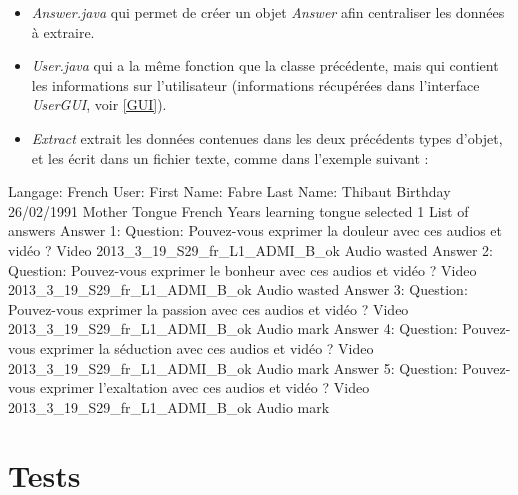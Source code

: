  \begin{itemize}
  \item \textit{Answer.java} qui permet de créer un objet \textit{Answer} afin centraliser les données à extraire.
  \item \textit{User.java} qui a la même fonction que la classe précédente, mais qui contient les informations sur l'utilisateur (informations récupérées dans l'interface \textit{UserGUI}, voir \ref{GUI}).
  \item \textit{Extract} extrait les données contenues dans les deux précédents types d'objet, et les écrit dans un fichier texte, comme dans l'exemple suivant :
 \end{itemize}
 
 \begin{verbatimtab}
  Langage:   French
  User:
      First Name:   Fabre
      Last Name:   Thibaut
      Birthday   26/02/1991
      Mother Tongue   French
      Years learning tongue selected   1
  List of answers
      Answer 1:
	    Question:   Pouvez-vous exprimer la douleur avec ces audios et vidéo ?
	    Video   2013_3_19_S29_fr_L1_ADMI_B_ok
	    Audio   wasted
      Answer 2:
	    Question:   Pouvez-vous exprimer le bonheur avec ces audios et vidéo ?
	    Video   2013_3_19_S29_fr_L1_ADMI_B_ok
	    Audio   wasted
      Answer 3:
	    Question:   Pouvez-vous exprimer la passion avec ces audios et vidéo ?
	    Video   2013_3_19_S29_fr_L1_ADMI_B_ok
	    Audio   mark
      Answer 4:
	    Question:   Pouvez-vous exprimer la séduction avec ces audios et vidéo ?
	    Video   2013_3_19_S29_fr_L1_ADMI_B_ok
	    Audio   mark
      Answer 5:
	    Question:   Pouvez-vous exprimer l'exaltation avec ces audios et vidéo ?
	    Video   2013_3_19_S29_fr_L1_ADMI_B_ok
	    Audio   mark

 \end{verbatimtab}



\section{Tests}\label{tests}
